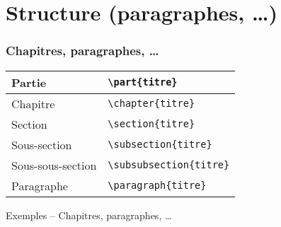 \section{Structure (paragraphes, \dots)}

\begin{frame}[containsverbatim]
    \frametitle{Chapitres, paragraphes, \dots}
    \begin{table}
        \centering
        \begin{tabular}{|l|l|}
            \hline
            Partie            & \verb|\part{titre}| \\
            \hline
            Chapitre          & \verb|\chapter{titre}| \\
            \hline
            Section           & \verb|\section{titre}| \\
            \hline
            Sous-section      & \verb|\subsection{titre}| \\
            \hline
            Sous-sous-section & \verb|\subsubsection{titre}| \\
            \hline
            Paragraphe        & \verb|\paragraph{titre}| \\
            \hline
        \end{tabular}
    \end{table}
    
\end{frame}

\begin{frame}{Exemples -- Chapitres, paragraphes, \dots}
    \encours
\end{frame}

